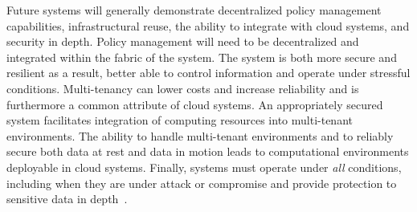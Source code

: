 Future systems will generally demonstrate decentralized policy management capabilities, infrastructural reuse, the ability to integrate with cloud systems, and security in depth.  Policy management will need to be decentralized and integrated within the fabric of the system.  The system is both more secure and resilient as a result, better able to control information and operate under stressful conditions.  Multi-tenancy can lower costs and increase reliability and is furthermore a common attribute of cloud systems.  An appropriately secured system facilitates integration of computing resources into multi-tenant environments.  The ability to handle multi-tenant environments and to reliably secure both data at rest and data in motion leads to computational environments deployable in cloud systems.  Finally, systems must operate under \textit{all} conditions, including when they are under attack or compromise and provide protection to sensitive data in depth~\cite{proposal:ron-ross}.
